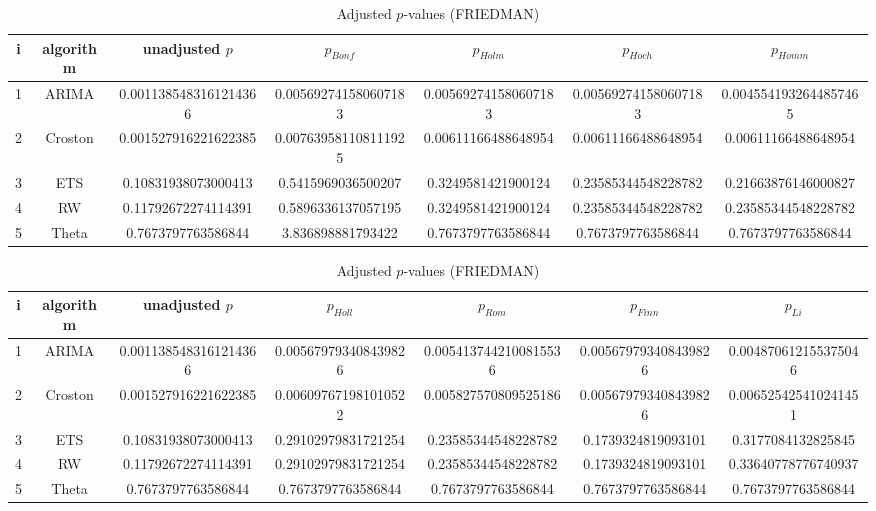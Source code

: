 \documentclass[a4paper,10pt]{article}
\begin{document}
\begin{landscape}
\begin{table}[!htp]
\centering\scriptsize
\caption{Adjusted $p$-values (FRIEDMAN)}
\begin{tabular}{ccccccc}
i&algorithm&unadjusted $p$&$p_{Bonf}$&$p_{Holm}$&$p_{Hoch}$&$p_{Homm}$\\
\hline
1&ARIMA&0.0011385483161214366&0.005692741580607183&0.005692741580607183&0.005692741580607183&0.0045541932644857465\\
2&Croston&0.001527916221622385&0.007639581108111925&0.00611166488648954&0.00611166488648954&0.00611166488648954\\
3&ETS&0.10831938073000413&0.5415969036500207&0.3249581421900124&0.23585344548228782&0.21663876146000827\\
4&RW&0.11792672274114391&0.5896336137057195&0.3249581421900124&0.23585344548228782&0.23585344548228782\\
5&Theta&0.7673797763586844&3.836898881793422&0.7673797763586844&0.7673797763586844&0.7673797763586844\\
\hline
\end{tabular}
\end{table}

\begin{table}[!htp]
\centering\scriptsize
\caption{Adjusted $p$-values (FRIEDMAN)}
\begin{tabular}{ccccccc}
i&algorithm&unadjusted $p$&$p_{Holl}$&$p_{Rom}$&$p_{Finn}$&$p_{Li}$\\
\hline
1&ARIMA&0.0011385483161214366&0.005679793408439826&0.0054137442100815536&0.005679793408439826&0.004870612155375046\\
2&Croston&0.001527916221622385&0.006097671981010522&0.005827570809525186&0.005679793408439826&0.006525425410241451\\
3&ETS&0.10831938073000413&0.29102979831721254&0.23585344548228782&0.1739324819093101&0.3177084132825845\\
4&RW&0.11792672274114391&0.29102979831721254&0.23585344548228782&0.1739324819093101&0.33640778776740937\\
5&Theta&0.7673797763586844&0.7673797763586844&0.7673797763586844&0.7673797763586844&0.7673797763586844\\
\hline
\end{tabular}
\end{table}


\newpage


\end{landscape}
\end{document}

